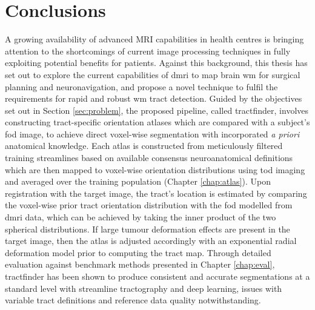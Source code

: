 \chapter{Conclusions}
\label{chapterlabel6}

A growing availability of advanced MRI capabilities in health centres is bringing attention to the shortcomings of current image processing techniques in fully exploiting potential benefits for patients.
Against this background, this thesis has set out to explore the current capabilities of \gls{dmri} to map brain \gls{wm} for surgical planning and neuronavigation, and propose a novel technique to fulfil the requirements for rapid and robust \gls{wm} tract detection.
Guided by the objectives set out in Section \ref{sec:problem}, the proposed pipeline, called tractfinder, involves constructing tract-specific orientation atlases which are compared with a subject's \gls{fod} image, to achieve direct voxel-wise segmentation with incorporated \textit{a priori} anatomical knowledge.
Each atlas is constructed from meticulously filtered training streamlines based on available consensus neuroanatomical definitions which are then mapped to voxel-wise orientation distributions using \gls{tod} imaging and averaged over the training population (Chapter \ref{chap:atlas}).
Upon registration with the target image, the tract's location is estimated by comparing the voxel-wise prior tract orientation distribution with the \gls{fod} modelled
from \gls{dmri} data, which can be achieved by taking the inner product of the two spherical distributions.
If large tumour deformation effects are present in the target image, then the atlas is adjusted accordingly with an exponential radial deformation model prior to computing the tract map.
Through detailed evaluation against benchmark methods presented in Chapter \ref{chap:eval}, tractfinder has been shown to produce consistent and accurate segmentations at a standard level with streamline tractography and deep learning, issues with variable tract definitions and reference data quality notwithstanding.

